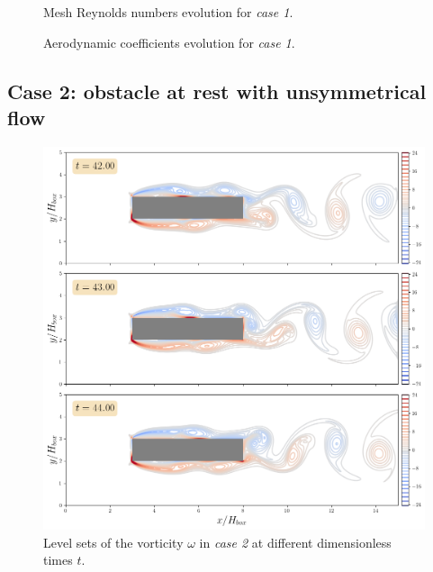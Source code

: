 \documentclass[11 pt]{article}
\begin{document}
\begin{figure}[H]
    \centering
    
    \caption{Mesh Reynolds numbers evolution for \textit{case 1}.}
    \label{fig:mesh_re_case1}
\end{figure}


\begin{figure}[H]
    \centering
    
    \caption{Aerodynamic coefficients evolution for \textit{case 1}.}
    \label{fig:drag_case1}
\end{figure}




\subsection{Case 2: obstacle at rest with unsymmetrical flow}
\begin{figure}[H]
    \centering
    \includegraphics[width=\textwidth]{../figures/vorticity_case_2.png}
    \caption{Level sets of the vorticity $\omega$ in \textit{case 2} at different dimensionless times $t$.}
    \label{fig:vorticity_2}
\end{figure}
\end{document}
